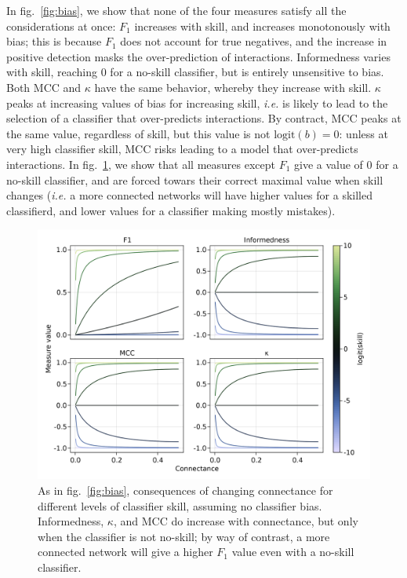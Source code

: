 \documentclass[11pt]{article}
\makeatletter
\def\maxwidth{\ifdim\Gin@nat@width>\linewidth\linewidth
\else\Gin@nat@width\fi}
\let\Oldincludegraphics\includegraphics
\renewcommand{\includegraphics}[1]{\Oldincludegraphics[width=\maxwidth]{#1}}
\makeatother
\begin{document}
In fig.~\ref{fig:bias}, we show that none of the four measures satisfy
all the considerations at once: \(F_1\) increases with skill, and
increases monotonously with bias; this is because \(F_1\) does not
account for true negatives, and the increase in positive detection masks
the over-prediction of interactions. Informedness varies with skill,
reaching 0 for a no-skill classifier, but is entirely unsensitive to
bias. Both MCC and \(\kappa\) have the same behavior, whereby they
increase with skill. \(\kappa\) peaks at increasing values of bias for
increasing skill, \emph{i.e.} is likely to lead to the selection of a
classifier that over-predicts interactions. By contract, MCC peaks at
the same value, regardless of skill, but this value is not
\(\text{logit}(b)=0\): unless at very high classifier skill, MCC risks
leading to a model that over-predicts interactions. In
fig.~\ref{fig:connectance}, we show that all measures except \(F_1\)
give a value of 0 for a no-skill classifier, and are forced towars their
correct maximal value when skill changes (\emph{i.e.} a more connected
networks will have higher values for a skilled classifierd, and lower
values for a classifier making mostly mistakes).

\begin{figure}
\hypertarget{fig:connectance}{%
\centering
\includegraphics{figures/changing-connectance.png}
\caption{As in fig.~\ref{fig:bias}, consequences of changing connectance
for different levels of classifier skill, assuming no classifier bias.
Informedness, \(\kappa\), and MCC do increase with connectance, but only
when the classifier is not no-skill; by way of contrast, a more
connected network will give a higher \(F_1\) value even with a no-skill
classifier.}\label{fig:connectance}
}
\end{figure}
\end{document}

